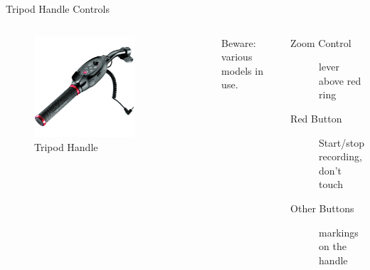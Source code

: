 \documentclass[aspectratio=169]{beamer}
\begin{document}
\begin{frame}{Tripod Handle Controls}
	\begin{columns}[T,onlytextwidth]
	\begin{figure} 
		\centering
		\includegraphics[width=0.7\textwidth]{images/tripod-handle.jpeg}
		\caption{Tripod Handle}
	\end{figure}

	Beware: various models in use.
	\begin{description}
		\item[Zoom Control] lever above red ring
		\item[Red Button] Start/stop recording, don't touch
		\item[Other Buttons] markings on the handle
    \end{description}
	\end{columns}
\end{frame}
\end{document}
